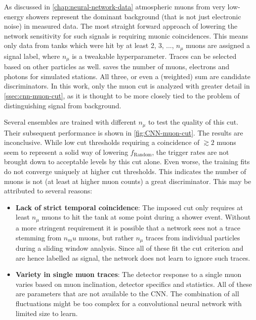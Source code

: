 As discussed in \autoref{chap:neural-network-data} atmospheric muons from very low-energy showers represent the dominant background (that is not just electronic 
noise) in measured data. The most straight forward approach of lowering the network sensitivity for such signals is requiring muonic coincidences. This means only 
data from tanks which were hit by at least 2, 3, ..., $n_\mu$ muons are assigned a signal label, where $n_\mu$ is a tweakable hyperparameter. Traces can be 
selected based on other particles as well. \Offline saves the number of muons, electrons and photons for simulated stations. All three, or even a (weighted) sum
are candidate discriminators. In this work, only the muon cut is analyzed with greater detail in \autoref{ssec:cnn-muon-cut}, as it is thought to be more closely 
tied to the problem of distinguishing signal from background.

Several ensembles are trained with different $n_\mu$ to test the quality of this cut. Their subsequent performance is shown in \autoref{fig:CNN-muon-cut}. The 
results are inconclusive. While low cut thresholds requiring a coincidence of $\gtrsim 2$ muons seem to represent a solid way of lowering $f_\text{Random}$, the 
trigger rates are not brought down to acceptable levels by this cut alone. Even worse, the training fits do not converge uniquely at higher cut thresholds.
This indicates the number of muons is not (at least at higher muon counts) a great discriminator. This may be attributed to several reasons:

\begin{itemize}
	\item \textbf{Lack of strict temporal coincidence}: The imposed cut only requires at least $n_\mu$ muons to hit the tank at some point during a shower event. 
	Without a more stringent requirement it is possible that a network sees not a trace stemming from $n_mu$ muons, but rather $n_\mu$ traces from 
	individual particles during a sliding window analysis. Since all of these fit the cut criterion and are hence labelled as signal, the network does not learn
	to ignore such traces.
	\item \textbf{Variety in single muon traces}: The detector response to a single muon varies based on muon inclination, detector specifics and statistics. All
	of these are parameters that are not available to the CNN. The combination of all fluctuations might be too complex for a convolutional neural network with 
	limited size to learn.
\end{itemize}

